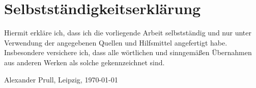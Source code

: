\documentclass[11pt, a4paper, twoside, openright, final]{book}
\makeatletter
\numberwithin{equation}{chapter}		%
\renewcommand*{\cleardoublepage}{\clearpage\if@twoside \ifodd\c@page\else
\hbox{}%
\thispagestyle{empty}%
\newpage%
\if@twocolumn\hbox{}\newpage\fi\fi\fi}
\newcommand{\1}{\mathbbm{1}}
\makeatother
\begin{document}
\cleardoublepage





\cleardoublepage
\chapter*{Selbstständigkeitserklärung}
Hiermit erkläre ich, dass ich die vorliegende Arbeit selbstständig und nur unter Verwendung der angegebenen Quellen und Hilfsmittel angefertigt habe. Insbesondere versichere ich, dass alle wörtlichen und sinngemäßen Übernahmen aus anderen Werken als solche gekennzeichnet sind.
\bigskip\bigskip\bigskip\bigskip\bigskip\bigskip\bigskip\bigskip
\begin{flushright}
	Alexander Prull, Leipzig, \today
\end{flushright}
\end{document}
